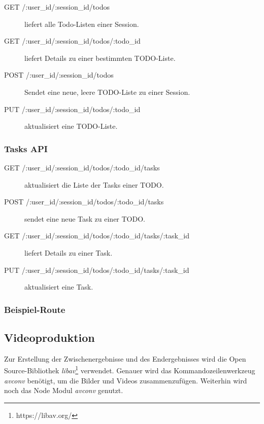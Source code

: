 \begin{description}

	\item[GET /:user\_id/:session\_id/todos] liefert alle Todo-Listen einer Session.
	\item[GET /:user\_id/:session\_id/todos/:todo\_id] liefert Details zu einer bestimmten TODO-Liste.
	\item[POST /:user\_id/:session\_id/todos] Sendet eine neue, leere TODO-Liste zu einer Session.
	
	\item[PUT /:user\_id/:session\_id/todos/:todo\_id] aktualisiert eine TODO-Liste.
	
\end{description}

\subsubsection{Tasks API}

\begin{description}

	\item[GET /:user\_id/:session\_id/todos/:todo\_id/tasks] aktualisiert die Liste der Tasks einer TODO.
	\item[POST /:user\_id/:session\_id/todos/:todo\_id/tasks] sendet eine neue Task zu einer TODO.
	
	\item[GET /:user\_id/:session\_id/todos/:todo\_id/tasks/:task\_id] liefert Details zu einer Task.
	
	\item[PUT /:user\_id/:session\_id/todos/:todo\_id/tasks/:task\_id] aktualisiert eine Task.
	  
\end{description}

\subsubsection{Beispiel-Route}
\subsection{Videoproduktion}

Zur Erstellung der Zwischenergebnisse und des Endergebnisses wird die Open Source-Bibliothek \emph{libav}\footnote{https://libav.org/} verwendet. 
Genauer wird das Kommandozeilenwerkzeug \textit{avconv} benötigt, um die Bilder und Videos zusammenzufügen. 
Weiterhin wird noch das Node Modul \emph{avconv} genutzt. 

